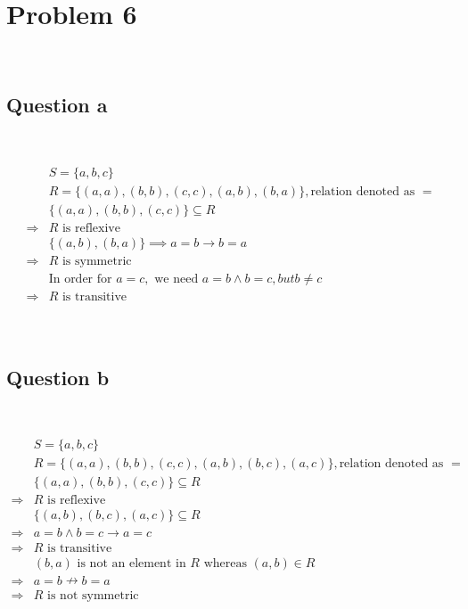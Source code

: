 \documentclass{article}
\begin{document}
\newpage

\section*{Problem 6}

~

\subsection*{Question a}

~

\begin{equation*}
    \begin{split}
        &S=\{a,b,c\}\\
        &R=\{(a,a),(b,b),(c,c),(a,b),(b,a)\},\text{relation denoted as }=\\
        &\{(a,a),(b,b),(c,c)\}\subseteq R\\
        \Rightarrow&R\text{ is reflexive}\\
        &\{(a,b),(b,a)\}\implies a= b\rightarrow b= a\\
        \Rightarrow&R\text{ is symmetric}\\
        &\text{In order for } a=c,\text{ we need }a=b\land b=c,{ but }b\ne c\\
        \Rightarrow &R\text{ is transitive}\\
    \end{split}
\end{equation*}

~

\subsection*{Question b}

~

\begin{equation*}
    \begin{split}
        &S=\{a,b,c\}\\
        &R=\{(a,a),(b,b),(c,c),(a,b),(b,c),(a,c)\},\text{relation denoted as }=\\
        &\{(a,a),(b,b),(c,c)\}\subseteq R\\
        \Rightarrow&R\text{ is reflexive}\\
        &\{(a,b),(b,c),(a,c)\}\subseteq R\\
        \Rightarrow&a=b\land b=c\rightarrow a=c\\
        \Rightarrow&R\text{ is transitive}\\
        &(b,a)\text{ is not an element in }R \text{ whereas }(a,b)\in R\\
        \Rightarrow&a=b\nrightarrow b=a\\
        \Rightarrow&R\text{ is not symmetric}\\
    \end{split}
\end{equation*}
\end{document}
